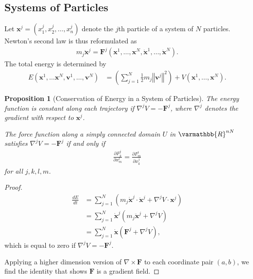 \documentclass[12pt]{extarticle}
\newcommand{\R}{\varmathbb{R}}
\newcommand{\norm}[1]{\left\Vert #1\right\Vert}
\theoremstyle{plain}
\newtheorem*{proposition}{Proposition}%
\theoremstyle{definition}
\theoremstyle{remark}
\renewcommand{\newline}{\hfill\break}
\begin{document}
  \subsection{Systems of Particles}%
  Let $\mathbf{x}^j = \left(x_{1}^j,x_2^j,\dots,x_n^j\right)$ denote the $j$th particle of a system of $N$ particles. Newton's second law is thus reformulated as
  \begin{align*}
    m_j\mathbf{\ddot{x}}^j = \mathbf{F}^j\left(\mathbf{x}^1,\dots,\mathbf{x}^N,\mathbf{\dot{x}}^1,\dots,\mathbf{\dot{x}}^N\right).
  \end{align*}
  The total energy is determined by
  \begin{align*}
    E(\mathbf{x}^1,\dots\mathbf{x}^N,\mathbf{v}^1,\dots,\mathbf{v}^N) &= \left(\sum_{j=1}^{N}\frac{1}{2}m_j\norm{\mathbf{v}^j}^2\right) + V(\mathbf{x}^1,\dots,\mathbf{x}^N).
  \end{align*}
  \begin{proposition}[Conservation of Energy in a System of Particles]
    
  The energy function is constant along each trajectory if $\nabla^{j}V = -\mathbf{F}^j$, where $\nabla^j$ denotes the gradient with respect to $\mathbf{x}^j$.\newline

  The force function along a simply connected domain $U$ in $\R^{nN}$ satisfies $\nabla^j V = -\mathbf{F}^j$ if and only if
  \begin{align*}
    \frac{\partial F_{k}^j}{\partial x_m^l} = \frac{\partial F_m^l}{\partial x_k^j}
  \end{align*}
  for all $j,k,l,m$.
  \end{proposition}
  \begin{proof}
      \begin{align*}
        \frac{dE}{dt} &= \sum_{j=1}^{N}\left(m_j\mathbf{\dot{x}}^j\cdot\mathbf{\ddot{x}}^j + \nabla^{j}V\cdot \mathbf{x}^j\right)\\
                      &= \sum_{j=1}^{N}\mathbf{\dot{x}}^j\left(m_j\mathbf{\ddot{x}}^j + \nabla^jV\right)\\
                      &= \sum_{j=1}^{N}\mathbf{\dot{x}}\left(\mathbf{F}^j + \nabla^j V\right),
      \end{align*}
      which is equal to zero if $\nabla^j V = -\mathbf{F}^j$.\newline

      Applying a higher dimension version of $\nabla \times \mathbf{F}$ to each coordinate pair $(a,b)$, we find the identity that shows $\mathbf{F}$ is a gradient field.
  \end{proof}
\end{document}
